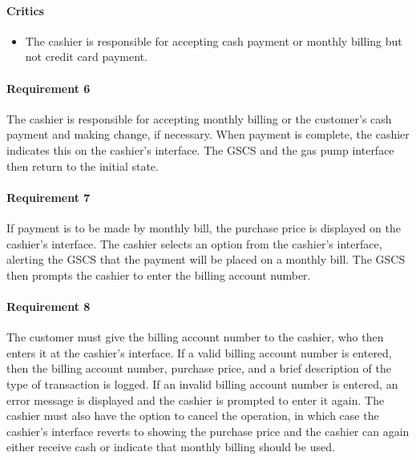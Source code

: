 \documentclass[11pt, a4paper]{article}
\begin{document}
\begin{framed}
    \paragraph{Critics} 
    \begin{itemize}
        \item The cashier is responsible for accepting cash payment or
            monthly billing but not credit card payment.
    \end{itemize}

    \paragraph{Requirement 6} The cashier is responsible for accepting
    monthly billing or the
    customer's cash payment and making change, if necessary. When payment is
    complete, the cashier indicates this on the cashier's interface. The GSCS
    and the gas pump interface then return to the initial state.
\end{framed}

\paragraph{Requirement 7} If payment is to be made by monthly bill, the
purchase price is displayed on the cashier's interface. The cashier
selects an option from the cashier's interface, alerting the GSCS that the
payment will be placed on a monthly bill. The GSCS then prompts the cashier
to enter the billing account number.

\paragraph{Requirement 8} The customer must give the billing account number
to the cashier, who then enters it at the cashier's interface. If a valid
billing account number is entered, then the billing account number, purchase
price, and a brief description of the type of transaction is logged. If an
invalid billing account number is entered, an error message is displayed
and the cashier is prompted to enter it again. The cashier must also have
the option to cancel the operation, in which case the cashier's interface
reverts to showing the purchase price and the cashier can again either
receive cash or indicate that monthly billing should be used.
\end{document}
